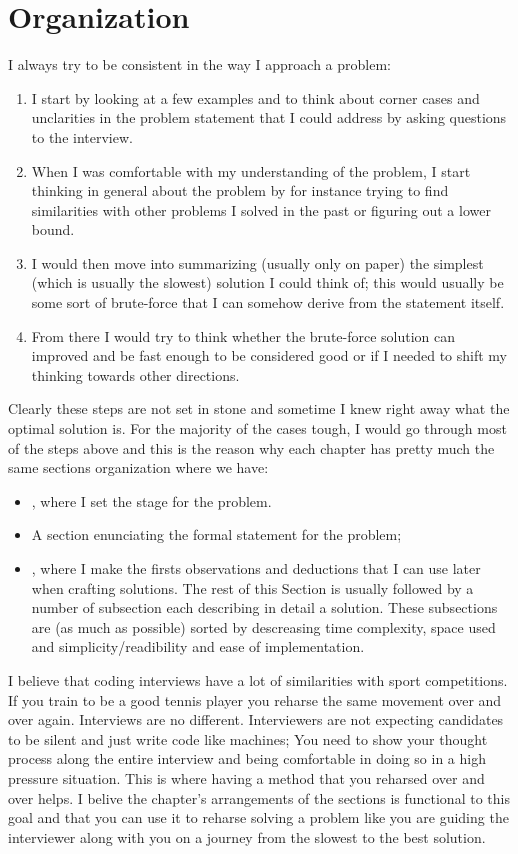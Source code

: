 \section*{Organization}
I always try to be consistent in the way I approach a problem:
\begin{enumerate}
    \item I start by looking at a few examples and to think about corner cases and unclarities in the problem statement that I could address by asking questions to the interview.
    \item When I was comfortable with my understanding of the problem, I start thinking in general about the problem by for instance trying to find similarities with other problems I solved in the past or figuring out a lower bound.
    \item I would then move into summarizing (usually only on paper) the simplest (which is usually the slowest) solution I could think of; this would usually be some sort of brute-force that I can somehow derive from the statement itself.
    \item  From there I would try to think whether the brute-force solution can improved and be fast enough to be considered good or if I needed to shift my thinking towards other directions.
\end{enumerate}
Clearly these steps are not set in stone and sometime I knew right away what the optimal solution is. 
For the majority of the cases tough, I would go through most of the steps above and this is the reason why each chapter has pretty much the same sections organization where we have:
\begin{itemize}
    \item \textit{}, where I set the stage for the problem.
    \item A section \textit{} enunciating the formal statement for the problem;
    \item \textit{}, where I make the firsts observations and deductions that I can use later when crafting solutions.
    The rest of this Section is usually followed by a number of subsection each describing in detail a solution. These subsections are (as much as possible) sorted by descreasing time complexity, space used and simplicity/readibility and ease of implementation. 
 \end{itemize}

I believe that coding interviews have a lot of similarities with sport competitions. If you train to be a good tennis player you reharse the same movement over and over again. Interviews are no different. 
Interviewers are not expecting candidates to be silent and just write code like machines; 
You need to show your thought process along the entire interview and being comfortable in doing so in a high pressure situation. This is where having a method that you reharsed over and over helps. I  belive the chapter's arrangements of the sections is functional to this goal and that you can use it to reharse solving a problem like you are guiding the interviewer along with you on a journey from the slowest to the best solution. 


